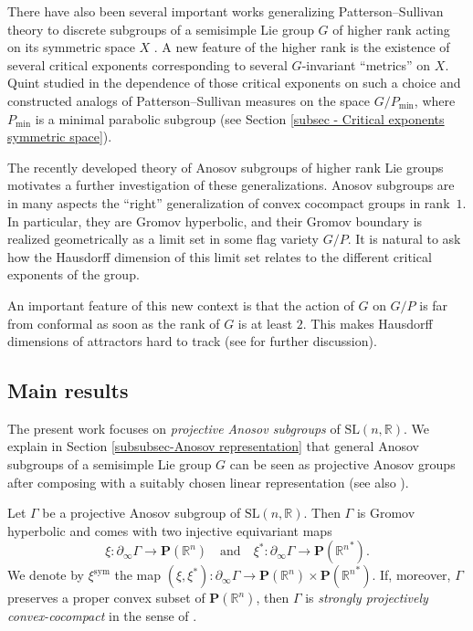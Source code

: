 \documentclass[JEP,XML,SOM,Unicode,NoEqCountersInSection,NoFloatCountersInSection,published]{cedram}
\newcommand{\quand}{\quad\text{and}\quad}
\newcommand{\sym}{\mathrm{sym}}
\theoremstyle{definition}
\newcommand{\proj}{\mathbf{P}}
\newcommand{\R}{\mathbb{R}}
\newcommand{\SL}{\mathrm{SL}}
\let\G\Gamma
\begin{document}
There have also been several important works generalizing Patterson--Sullivan theory to discrete subgroups of a semisimple Lie group $G$ of higher rank acting on its symmetric space $X$ \cite{link2005measures,quint2002mesures}. A new feature of the higher rank is the existence of several critical exponents corresponding to several $G$-invariant ``metrics'' on $X$. Quint studied in \cite{quint2002mesures} the dependence of those critical exponents on such a choice and constructed analogs of Patterson--Sullivan measures on the space $G/P_{\min}$, where $P_{\min}$ is a minimal parabolic subgroup (see Section \ref{subsec - Critical exponents symmetric space}).

The recently developed theory of Anosov subgroups of higher rank Lie groups motivates a further investigation of these generalizations. Anosov subgroups are in many aspects the ``right'' generalization of convex cocompact groups in rank~$1$. In particular, they are Gromov hyperbolic, and their Gromov boundary is realized geometrically as a limit set in some flag variety $G/P$. It is natural to ask how the Hausdorff dimension of this limit set relates to the different critical exponents of the group.

An important feature of this new context is that the action of $G$ on $G/P$ is far from conformal as soon as the rank of $G$ is at least $2$. This makes Hausdorff dimensions of attractors hard to track (see \cite{PSW19} for further discussion).

\subsection{Main results}

The present work focuses on \emph{projective Anosov subgroups} of $\SL(n,\R)$. We explain in Section \ref{subsubsec-Anosov representation} that general Anosov subgroups of a semisimple Lie group $G$ can be seen as projective Anosov groups after composing with a suitably chosen linear representation (see also \cite[\S 3.3]{gueritaud20017anosov}).

Let $\G$ be a projective Anosov subgroup of $\SL(n,\R)$. Then $\G$ is Gromov hyperbolic and comes with two injective equivariant maps
\[
\xi : \partial_\infty \G \to \proj (\R^n)\quand \xi^* : \partial_\infty \G \to \proj ({\R^n}^*).
\]
We denote by $\xi^{\sym}$ the map $(\xi,\xi^*): \partial_\infty \G \to \proj (\R^n) \times \proj({\R^n}^*)$. If, moreover, $\G$ preserves a proper convex subset of $\proj(\R^n)$, then $\G$ is \emph{strongly projectively convex-cocompact} in the sense of \cite{DGK}.
\end{document}
